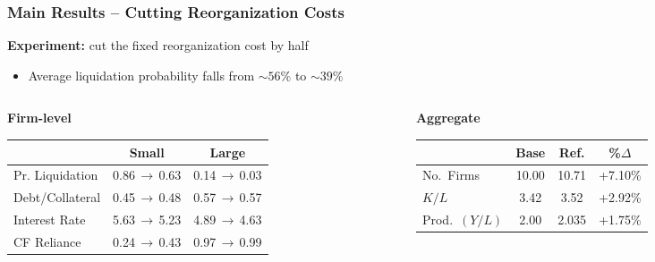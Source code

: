 \documentclass[aspectratio=169,xcolor=table]{beamer}
\begin{document}
\begin{frame}[label=effects] \frametitle{Main Results -- Cutting Reorganization Costs \hfill \hyperlink{modelfit}{}}

\textbf{Experiment:} cut the fixed reorganization cost by half
\begin{itemize} \small
    \item Average liquidation probability falls from $\sim 56\%$ to $\sim 39\%$
\end{itemize} \normalsize \vspace{1mm}

\begin{columns}[T,onlytextwidth]
\begin{column}{0.57\textwidth}
\centering \footnotesize
\textbf{Firm-level} \\[1mm]
\renewcommand{\arraystretch}{0.95}
\begin{tabular}{lcc}
\toprule
 & \textbf{Small} & \textbf{Large} \\
\midrule
Pr. Liquidation & 0.86\,$\to$\,\textcolor{primary}{0.63} & 0.14\,$\to$\,\textcolor{primary}{0.03} \\
Debt/Collateral & 0.45\,$\to$\,\textcolor{primary}{0.48} & 0.57\,$\to$\,\textcolor{primary}{0.57} \\
Interest Rate   & 5.63\,$\to$\,\textcolor{primary}{5.23} & 4.89\,$\to$\,\textcolor{primary}{4.63} \\
CF Reliance     & 0.24\,$\to$\,\textcolor{primary}{0.43} & 0.97\,$\to$\,\textcolor{primary}{0.99} \\
\bottomrule
\end{tabular}
\end{column}
\begin{column}{0.42\textwidth}
\centering \footnotesize
\textbf{Aggregate}\\[1mm]
\renewcommand{\arraystretch}{0.95}
\begin{tabular}{lccc}
\toprule
 & \textbf{Base} & \textbf{Ref.} & \textbf{\%$\Delta$} \\
\midrule
No.\ Firms & 10.00 & 10.71 & +7.10\% \\
$K/L$ & 3.42 & 3.52 & +2.92\% \\
Prod.\ $(Y/L)$ & 2.00 & 2.035 & \textcolor{primary}{+1.75\%} \\
\bottomrule
\end{tabular}
\end{column}
\end{columns}
\vspace{4mm}


\end{frame}
\end{document}
